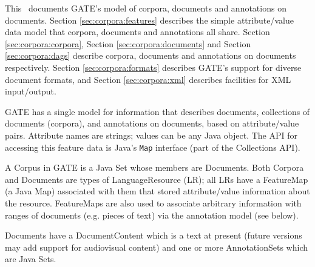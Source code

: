 %
%
%
%
\nnormalsize
This \chapthing\ documents GATE's model of corpora, documents and annotations
on documents. Section \ref{sec:corpora:features} describes the simple
attribute/value data model that corpora, documents and annotations all share. Section
\ref{sec:corpora:corpora}, Section \ref{sec:corpora:documents} and Section
\ref{sec:corpora:dags} describe corpora, documents and annotations on documents
respectively. Section \ref{sec:corpora:formats} describes GATE's support for
diverse document formats, and Section \ref{sec:corpora:xml} describes
facilities for XML input/output.



GATE has a single model for information that describes documents, collections
of documents (corpora), and annotations on documents, based on attribute/value
pairs. Attribute names are strings; values can be any Java object. The API
for accessing this feature data is Java's {\tt Map} interface (part of the
Collections API).



A Corpus in GATE is a Java Set whose members are Documents.
Both Corpora and Documents are types of LanguageResource (LR); all
LRs have a FeatureMap (a Java Map) associated with them that
stored attribute/value information about the resource. FeatureMaps are also
used to associate arbitrary information with ranges of documents (e.g. pieces
of text) via the annotation model (see below).

Documents have a DocumentContent which is
a text at present (future versions may add support for audiovisual content)
and one or more AnnotationSets which are Java Sets.


